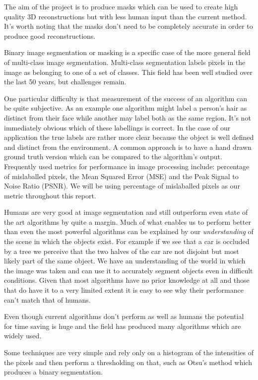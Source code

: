 \documentclass[12pt]{IIBproject}
\begin{document}
The aim of the project is to produce masks which can be used to create high quality 3D reconstructions but with less human input than the current method. It's worth noting that the masks don't need to be completely accurate in order to produce good reconstructions.

Binary image segmentation or masking is a specific case of the more general field of multi-class image segmentation\cite{pal1993review}. Multi-class segmentation labels pixels in the image as belonging to one of a set of classes. This field has been well studied over the last 50 years\cite{wang2008image}, but challenges remain. 

One particular difficulty is that measurement of the success of an algorithm can be quite subjective. As an example one algorithm might label a person's hair as distinct from their face while another may label both as the same region. It's not immediately obvious which of these labellings is correct. In the case of our application the true labels are rather more clear because the object is well defined and distinct from the environment. A common approach is to have a hand drawn ground truth version which can be compared to the algorithm's output. Frequently used metrics for performance in image processing include: percentage of mislaballed pixels, the Mean Squared Error (MSE) and the Peak Signal to Noise Ratio (PSNR)\cite{ponomarenko2009metrics}. We will be using percentage of mislaballed pixels as our metric throughout this report.  

Humans are very good at image segmentation and still outperform even state of the art algorithms by quite a margin\cite{guraripull}. Much of what enables us to perform better than even the most powerful algorithms can be explained by our \emph{understanding} of the scene in which the objects exist. For example if we see that a car is occluded by a tree we perceive that the two halves of the car are not disjoint but most likely part of the same object. We have an understanding of the world in which the image was taken and can use it to accurately segment objects even in difficult conditions. Given that most algorithms have no prior knowledge at all and those that do have it to a very limited extent it is easy to see why their performance can't match that of humans.

Even though current algorithms don't perform as well as humans the potential for time saving is huge and the field has produced many algorithms which are widely used. 

Some techniques are very simple and rely only on a histogram of the intensities of the pixels and then perform a thresholding on that, such as Otsu's method\cite{otsu1975threshold} which produces a binary segmentation. 
\end{document}
